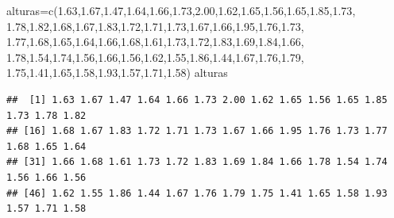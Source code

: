 \documentclass[
]{book}
\newenvironment{Shaded}{\begin{snugshade}}{\end{snugshade}}
\newcommand{\FloatTok}[1]{\textcolor[rgb]{0.00,0.00,0.81}{#1}}
\newcommand{\FunctionTok}[1]{\textcolor[rgb]{0.00,0.00,0.00}{#1}}
\newcommand{\NormalTok}[1]{#1}
\newcommand{\OtherTok}[1]{\textcolor[rgb]{0.56,0.35,0.01}{#1}}
\begin{document}
\begin{Shaded}
\begin{Highlighting}[]
\NormalTok{alturas}\OtherTok{=}\FunctionTok{c}\NormalTok{(}\FloatTok{1.63}\NormalTok{,}\FloatTok{1.67}\NormalTok{,}\FloatTok{1.47}\NormalTok{,}\FloatTok{1.64}\NormalTok{,}\FloatTok{1.66}\NormalTok{,}\FloatTok{1.73}\NormalTok{,}\FloatTok{2.00}\NormalTok{,}\FloatTok{1.62}\NormalTok{,}\FloatTok{1.65}\NormalTok{,}\FloatTok{1.56}\NormalTok{,}\FloatTok{1.65}\NormalTok{,}\FloatTok{1.85}\NormalTok{,}\FloatTok{1.73}\NormalTok{,}
          \FloatTok{1.78}\NormalTok{,}\FloatTok{1.82}\NormalTok{,}\FloatTok{1.68}\NormalTok{,}\FloatTok{1.67}\NormalTok{,}\FloatTok{1.83}\NormalTok{,}\FloatTok{1.72}\NormalTok{,}\FloatTok{1.71}\NormalTok{,}\FloatTok{1.73}\NormalTok{,}\FloatTok{1.67}\NormalTok{,}\FloatTok{1.66}\NormalTok{,}\FloatTok{1.95}\NormalTok{,}\FloatTok{1.76}\NormalTok{,}\FloatTok{1.73}\NormalTok{,}
          \FloatTok{1.77}\NormalTok{,}\FloatTok{1.68}\NormalTok{,}\FloatTok{1.65}\NormalTok{,}\FloatTok{1.64}\NormalTok{,}\FloatTok{1.66}\NormalTok{,}\FloatTok{1.68}\NormalTok{,}\FloatTok{1.61}\NormalTok{,}\FloatTok{1.73}\NormalTok{,}\FloatTok{1.72}\NormalTok{,}\FloatTok{1.83}\NormalTok{,}\FloatTok{1.69}\NormalTok{,}\FloatTok{1.84}\NormalTok{,}\FloatTok{1.66}\NormalTok{,}
          \FloatTok{1.78}\NormalTok{,}\FloatTok{1.54}\NormalTok{,}\FloatTok{1.74}\NormalTok{,}\FloatTok{1.56}\NormalTok{,}\FloatTok{1.66}\NormalTok{,}\FloatTok{1.56}\NormalTok{,}\FloatTok{1.62}\NormalTok{,}\FloatTok{1.55}\NormalTok{,}\FloatTok{1.86}\NormalTok{,}\FloatTok{1.44}\NormalTok{,}\FloatTok{1.67}\NormalTok{,}\FloatTok{1.76}\NormalTok{,}\FloatTok{1.79}\NormalTok{,}
          \FloatTok{1.75}\NormalTok{,}\FloatTok{1.41}\NormalTok{,}\FloatTok{1.65}\NormalTok{,}\FloatTok{1.58}\NormalTok{,}\FloatTok{1.93}\NormalTok{,}\FloatTok{1.57}\NormalTok{,}\FloatTok{1.71}\NormalTok{,}\FloatTok{1.58}\NormalTok{)}
\NormalTok{alturas}
\end{Highlighting}
\end{Shaded}

\begin{verbatim}
##  [1] 1.63 1.67 1.47 1.64 1.66 1.73 2.00 1.62 1.65 1.56 1.65 1.85 1.73 1.78 1.82
## [16] 1.68 1.67 1.83 1.72 1.71 1.73 1.67 1.66 1.95 1.76 1.73 1.77 1.68 1.65 1.64
## [31] 1.66 1.68 1.61 1.73 1.72 1.83 1.69 1.84 1.66 1.78 1.54 1.74 1.56 1.66 1.56
## [46] 1.62 1.55 1.86 1.44 1.67 1.76 1.79 1.75 1.41 1.65 1.58 1.93 1.57 1.71 1.58
\end{verbatim}

\hfill\break
\end{document}
